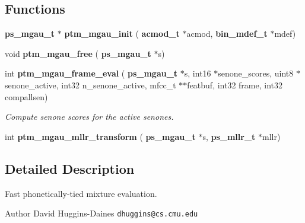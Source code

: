 \subsection*{Functions}
\begin{DoxyCompactItemize}
\item 
\mbox{\label{ptm__mgau_8h_a712679ca84e5b9f7351d969abbe1021a}} 
\textbf{ ps\+\_\+mgau\+\_\+t} $\ast$ {\bfseries ptm\+\_\+mgau\+\_\+init} (\textbf{ acmod\+\_\+t} $\ast$acmod, \textbf{ bin\+\_\+mdef\+\_\+t} $\ast$mdef)
\item 
\mbox{\label{ptm__mgau_8h_ac202aeb266594ab9c98294a73e16f00a}} 
void {\bfseries ptm\+\_\+mgau\+\_\+free} (\textbf{ ps\+\_\+mgau\+\_\+t} $\ast$s)
\item 
\mbox{\label{ptm__mgau_8h_ae9fb76ef388e6541bd6c1b20fe8bc094}} 
int \textbf{ ptm\+\_\+mgau\+\_\+frame\+\_\+eval} (\textbf{ ps\+\_\+mgau\+\_\+t} $\ast$s, int16 $\ast$senone\+\_\+scores, uint8 $\ast$senone\+\_\+active, int32 n\+\_\+senone\+\_\+active, mfcc\+\_\+t $\ast$$\ast$featbuf, int32 frame, int32 compallsen)
\begin{DoxyCompactList}\small\item\em Compute senone scores for the active senones. \end{DoxyCompactList}\item 
\mbox{\label{ptm__mgau_8h_ad619b68c9db5e2fed688f62ea4468c4e}} 
int {\bfseries ptm\+\_\+mgau\+\_\+mllr\+\_\+transform} (\textbf{ ps\+\_\+mgau\+\_\+t} $\ast$s, \textbf{ ps\+\_\+mllr\+\_\+t} $\ast$mllr)
\end{DoxyCompactItemize}


\subsection{Detailed Description}
Fast phonetically-\/tied mixture evaluation. 

\begin{DoxyAuthor}{Author}
David Huggins-\/\+Daines {\tt dhuggins@cs.\+cmu.\+edu} 
\end{DoxyAuthor}
